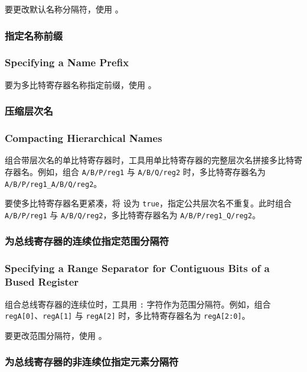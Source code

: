 要更改默认名称分隔符，使用 。

\subsubsection{指定名称前缀}
\subsubsection*{Specifying a Name Prefix}

要为多比特寄存器名称指定前缀，使用 。

\subsubsection{压缩层次名}
\subsubsection*{Compacting Hierarchical Names}

组合带层次名的单比特寄存器时，工具用单比特寄存器的完整层次名拼接多比特寄存器名。例如，组合 \texttt{A/B/P/reg1} 与 \texttt{A/B/Q/reg2} 时，多比特寄存器名为 \texttt{A/B/P/reg1\_A/B/Q/reg2}。

要使多比特寄存器名更紧凑，将  设为 \texttt{true}，指定公共层次名不重复。此时组合 \texttt{A/B/P/reg1} 与 \texttt{A/B/Q/reg2}，多比特寄存器名为 \texttt{A/B/P/reg1\_Q/reg2}。

\subsubsection{为总线寄存器的连续位指定范围分隔符}
\subsubsection*{Specifying a Range Separator for Contiguous Bits of a Bused Register}

组合总线寄存器的连续位时，工具用 \texttt{:} 字符作为范围分隔符。例如，组合 \texttt{regA[0]}、\texttt{regA[1]} 与 \texttt{regA[2]} 时，多比特寄存器名为 \texttt{regA[2:0]}。

要更改范围分隔符，使用 。

\subsubsection{为总线寄存器的非连续位指定元素分隔符}
